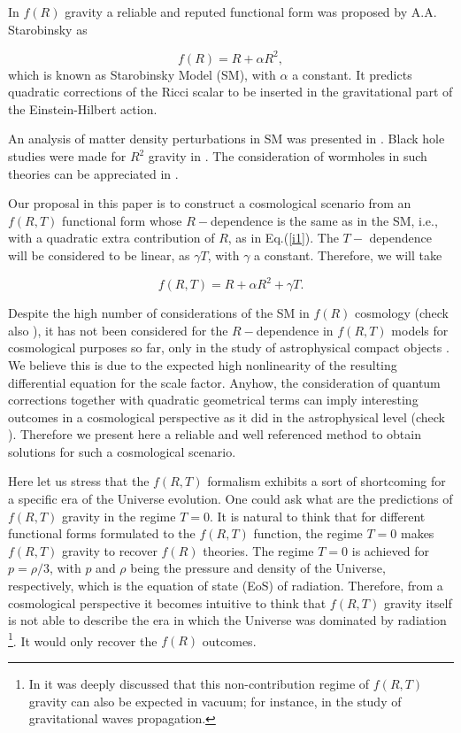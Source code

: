 In $f(R)$ gravity a reliable and reputed functional form was proposed by
A.A. Starobinsky as \cite{starobinsky/2007}

\begin{equation}  \label{i1}
f(R)=R+\alpha R^{2},
\end{equation}
which is known as Starobinsky Model (SM), with $\alpha$ a constant. It
predicts quadratic corrections of the Ricci scalar to be inserted in the
gravitational part of the Einstein-Hilbert action. 

An analysis of matter density perturbations in SM was presented in \cite%
{fu/2010}. Black hole studies were made for $R^{2}$ gravity in \cite%
{hendi/2011}. The consideration of wormholes in such theories can be
appreciated in \cite{pavlovic/2015,kaneda/2016}.

Our proposal in this paper is to construct a cosmological scenario from an $%
f(R,T)$ functional form whose $R-$dependence is the same as in the SM, i.e.,
with a quadratic extra contribution of $R$, as in Eq.(\ref{i1}). The $T-$%
dependence will be considered to be linear, as $\gamma T$, with $\gamma$ a
constant. Therefore, we will take

\begin{equation}  \label{i2}
f(R,T)=R+\alpha R^{2}+\gamma T.
\end{equation}

Despite the high number of considerations of the SM in $f(R)$ cosmology
(check also \cite{goswami/2013,nojiri/2015,abebe/2016}), it has not been
considered for the $R-$dependence in $f(R,T)$ models for cosmological
purposes so far, only in the study of astrophysical compact objects \cite%
{zubair/2015,noureen/2015,noureen/2015b}. We believe this is due to the
expected high nonlinearity of the resulting differential equation for the
scale factor. Anyhow, the consideration of quantum corrections together with
quadratic geometrical terms can imply interesting outcomes in a cosmological
perspective as it did in the astrophysical level (check \cite%
{zubair/2015,noureen/2015,noureen/2015b}). Therefore we present here a
reliable and well referenced method to obtain solutions for such a
cosmological scenario.

Here let us stress that the $f(R,T)$ formalism exhibits a sort of
shortcoming for a specific era of the Universe evolution. One could ask what
are the predictions of $f(R,T)$ gravity in the regime $T=0$. It is natural
to think that for different functional forms formulated to the $f(R,T)$
function, the regime $T=0$ makes $f(R,T)$ gravity to recover $f(R)$
theories. The regime $T=0$ is achieved for $p=\rho/3$, with $p$ and $\rho$
being the pressure and density of the Universe, respectively, which is the
equation of state (EoS) of radiation. Therefore, from a cosmological
perspective it becomes intuitive to think that $f(R,T)$ gravity itself is
not able to describe the era in which the Universe was dominated by radiation%
\footnote{%
In \cite{ms/2016} it was deeply discussed that this non-contribution regime
of $f(R,T)$ gravity can also be expected in vacuum; for instance, in the
study of gravitational waves propagation.}. It would only recover the $f(R)$ outcomes.

